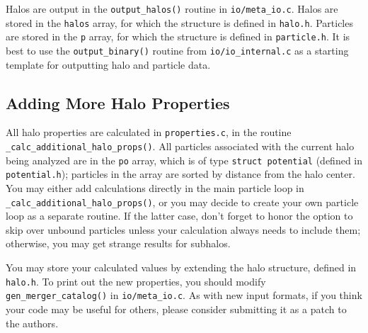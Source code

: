 \documentclass[12pt]{article}
\begin{document}
Halos are output in the \texttt{output\_halos()} routine in \texttt{io/meta\_io.c}.  Halos are stored in the \texttt{halos} array, for which the structure is defined in \texttt{halo.h}.  Particles are stored in the \texttt{p} array, for which the structure is defined in \texttt{particle.h}.  It is best to use the \texttt{output\_binary()} routine from \texttt{io/io\_internal.c} as a starting template for outputting halo and particle data.

\subsection{Adding More Halo Properties}
\label{s:new_properties}
All halo properties are calculated in \texttt{properties.c}, in the routine\\ \texttt{\_calc\_additional\_halo\_props()}.  All particles associated with the current halo being analyzed are in the \texttt{po} array, which is of type \texttt{struct potential} (defined in \texttt{potential.h}); particles in the array are sorted by distance from the halo center.  You may either add calculations directly in the main particle loop in \texttt{\_calc\_additional\_halo\_props()}, or you may decide to create your own particle loop as a separate routine.  If the latter case, don't forget to honor the option to skip over unbound particles unless your calculation always needs to include them; otherwise, you may get strange results for subhalos.

You may store your calculated values by extending the halo structure, defined in \texttt{halo.h}.  To print out the new properties, you should modify \texttt{gen\_merger\_catalog()} in \texttt{io/meta\_io.c}.  As with new input formats, if you think your code may be useful for others, please consider submitting it as a patch to the authors.
\end{document}
